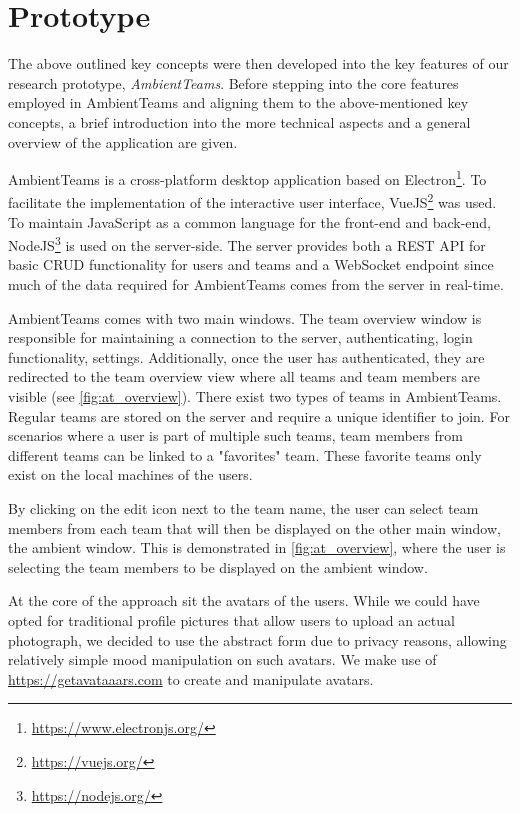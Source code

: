 \chapter{Prototype}
The above outlined key concepts were then developed into the key features of our research prototype, \textit{AmbientTeams}. Before stepping into the core features employed in AmbientTeams and aligning them to the above-mentioned key concepts, a brief introduction into the more technical aspects and a general overview of the application are given.

AmbientTeams is a cross-platform desktop application based on Electron\footnote{\url{https://www.electronjs.org/}}. To facilitate the implementation of the interactive user interface, VueJS\footnote{\url{https://vuejs.org/}} was used. To maintain JavaScript as a common language for the front-end and back-end, NodeJS\footnote{\url{https://nodejs.org/}} is used on the server-side. The server provides both a REST API for basic CRUD functionality for users and teams and a WebSocket endpoint since much of the data required for AmbientTeams comes from the server in real-time.

AmbientTeams comes with two main windows. The team overview window is responsible for maintaining a connection to the server, authenticating, login functionality, settings. Additionally, once the user has authenticated, they are redirected to the team overview view where all teams and team members are visible (see \autoref{fig:at_overview}). There exist two types of teams in AmbientTeams. Regular teams are stored on the server and require a unique identifier to join. For scenarios where a user is part of multiple such teams, team members from different teams can be linked to a "favorites" team. These favorite teams only exist on the local machines of the users.

By clicking on the edit icon next to the team name, the user can select team members from each team that will then be displayed on the other main window, the ambient window. This is demonstrated in \autoref{fig:at_overview}, where the user is selecting the team members to be displayed on the ambient window.

At the core of the approach sit the avatars of the users. While we could have opted for traditional profile pictures that allow users to upload an actual photograph, we decided to use the abstract form due to privacy reasons, allowing relatively simple mood manipulation on such avatars. We make use of \url{https://getavataaars.com} to create and manipulate avatars.


